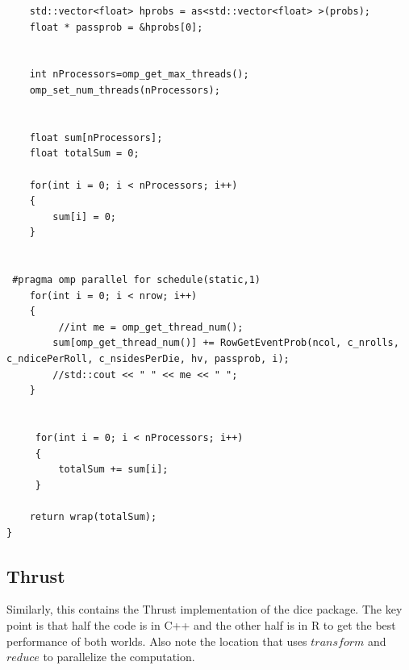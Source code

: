 \documentclass[12pt]{article}
\begin{document}
\begin{lstlisting}
    std::vector<float> hprobs = as<std::vector<float> >(probs);
    float * passprob = &hprobs[0];


    int nProcessors=omp_get_max_threads();
    omp_set_num_threads(nProcessors);


    float sum[nProcessors];
    float totalSum = 0;

    for(int i = 0; i < nProcessors; i++)
    {
        sum[i] = 0;
    }


 #pragma omp parallel for schedule(static,1)
    for(int i = 0; i < nrow; i++)
    {
         //int me = omp_get_thread_num();
        sum[omp_get_thread_num()] += RowGetEventProb(ncol, c_nrolls, c_ndicePerRoll, c_nsidesPerDie, hv, passprob, i);
        //std::cout << " " << me << " ";
    }

    
     for(int i = 0; i < nProcessors; i++)
     {
         totalSum += sum[i];
     }

    return wrap(totalSum);
}
\end{lstlisting}

\subsection{Thrust}

Similarly, this contains the Thrust implementation of the dice package. The key point is that half the code is in C++ and the other half is in R to get the best performance of both worlds. Also note the location that uses $transform$ and $reduce$ to parallelize the computation.
\end{document}
